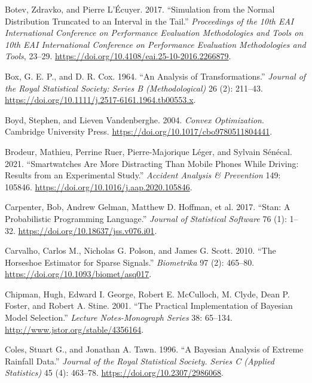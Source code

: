 \documentclass[
  11pt,
  letterpaper,
]{scrbook}
\newlength{\cslhangindent}
\newenvironment{CSLReferences}[2] %
 {\begin{list}{}{%
  \setlength{\itemindent}{0pt}
  \setlength{\leftmargin}{0pt}
  \setlength{\parsep}{0pt}
  \ifodd #1
   \setlength{\leftmargin}{\cslhangindent}
   \setlength{\itemindent}{-1\cslhangindent}
  \fi
  \setlength{\itemsep}{#2\baselineskip}}}
 {\end{list}}
\theoremstyle{definition}
\theoremstyle{plain}
\theoremstyle{plain}
\theoremstyle{plain}
\theoremstyle{definition}
\theoremstyle{definition}
\theoremstyle{plain}
\theoremstyle{plain}
\theoremstyle{remark}
\begin{document}
\begin{CSLReferences}{1}{1}
Botev, Zdravko, and Pierre L'Écuyer. 2017. {``Simulation from the Normal
Distribution Truncated to an Interval in the Tail.''} \emph{Proceedings
of the 10th EAI International Conference on Performance Evaluation
Methodologies and Tools on 10th EAI International Conference on
Performance Evaluation Methodologies and Tools}, 23--29.
\url{https://doi.org/10.4108/eai.25-10-2016.2266879}.

Box, G. E. P., and D. R. Cox. 1964. {``An Analysis of
Transformations.''} \emph{Journal of the Royal Statistical Society:
Series B (Methodological)} 26 (2): 211--43.
\url{https://doi.org/10.1111/j.2517-6161.1964.tb00553.x}.

Boyd, Stephen, and Lieven Vandenberghe. 2004. \emph{Convex
Optimization}. Cambridge University Press.
\url{https://doi.org/10.1017/cbo9780511804441}.

Brodeur, Mathieu, Perrine Ruer, Pierre-Majorique Léger, and Sylvain
Sénécal. 2021. {``Smartwatches Are More Distracting Than Mobile Phones
While Driving: Results from an Experimental Study.''} \emph{Accident
Analysis \& Prevention} 149: 105846.
\url{https://doi.org/10.1016/j.aap.2020.105846}.

Carpenter, Bob, Andrew Gelman, Matthew D. Hoffman, et al. 2017.
{``{Stan}: A Probabilistic Programming Language.''} \emph{Journal of
Statistical Software} 76 (1): 1--32.
\url{https://doi.org/10.18637/jss.v076.i01}.

Carvalho, Carlos M., Nicholas G. Polson, and James G. Scott. 2010.
{``The Horseshoe Estimator for Sparse Signals.''} \emph{Biometrika} 97
(2): 465--80. \url{https://doi.org/10.1093/biomet/asq017}.

Chipman, Hugh, Edward I. George, Robert E. McCulloch, M. Clyde, Dean P.
Foster, and Robert A. Stine. 2001. {``The Practical Implementation of
{B}ayesian Model Selection.''} \emph{Lecture Notes-Monograph Series} 38:
65--134. \url{http://www.jstor.org/stable/4356164}.

Coles, Stuart G., and Jonathan A. Tawn. 1996. {``A {B}ayesian Analysis
of Extreme Rainfall Data.''} \emph{Journal of the Royal Statistical
Society. Series C (Applied Statistics)} 45 (4): 463--78.
\url{https://doi.org/10.2307/2986068}.


\end{CSLReferences}
\end{document}
